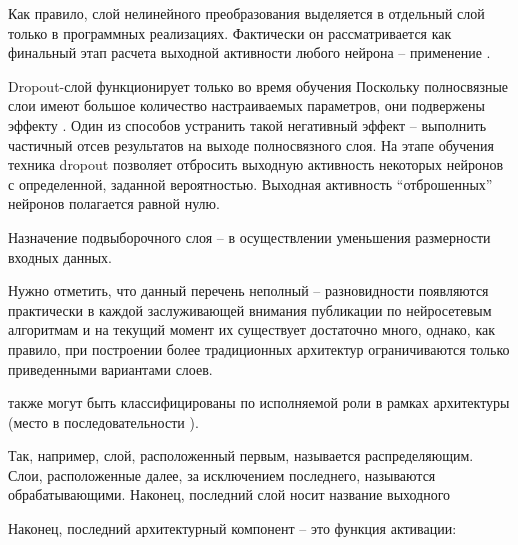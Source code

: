 Как правило, слой нелинейного преобразования  выделяется в отдельный слой только в программных реализациях. Фактически он рассматривается как финальный этап расчета выходной активности любого нейрона -- применение .

Dropout-слой функционирует только во время обучения  Поскольку полносвязные слои имеют большое количество настраиваемых параметров, они подвержены эффекту . Один из способов устранить такой негативный эффект -- выполнить частичный отсев результатов на выходе полносвязного слоя. На этапе обучения техника dropout позволяет отбросить выходную активность некоторых нейронов с определенной, заданной вероятностью. Выходная активность ``отброшенных'' нейронов полагается равной нулю.

Назначение подвыборочного слоя -- в осуществлении уменьшения размерности входных данных.

Нужно отметить, что данный перечень неполный -- разновидности  появляются практически в каждой заслуживающей внимания публикации по нейросетевым алгоритмам и на текущий момент их существует достаточно много, однако, как правило, при построении более традиционных архитектур ограничиваются только приведенными вариантами слоев.

 также могут быть классифицированы по исполняемой роли в рамках архитектуры (место в последовательности ).

Так, например, слой, расположенный первым, называется распределяющим. Слои, расположенные далее, за исключением последнего, называются обрабатывающими. Наконец, последний слой носит название выходного 

Наконец, последний архитектурный компонент  -- это функция активации:

\begin{SCn}
		
\end{SCn}

